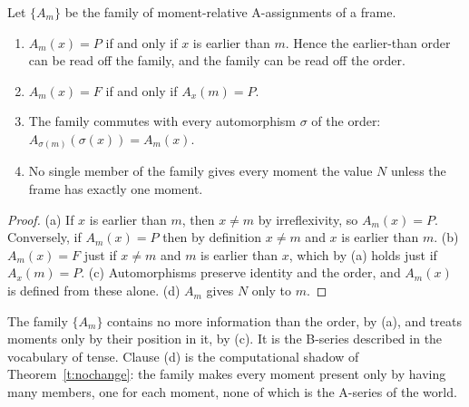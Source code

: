 \documentclass{situationist-preprint}
\begin{document}
\begin{proposition}\label{p:stage}
Let $\{A_m\}$ be the family of moment-relative A-assignments of a frame.
\begin{enumerate}[label=(\alph*)]
\item $A_m(x) = P$ if and only if $x$ is earlier than $m$. Hence the earlier-than order can be read off the family, and the family can be read off the order.
\item $A_m(x) = F$ if and only if $A_x(m) = P$.
\item The family commutes with every automorphism $\sigma$ of the order: $A_{\sigma(m)}(\sigma(x)) = A_m(x)$.
\item No single member of the family gives every moment the value $N$ unless the frame has exactly one moment.
\end{enumerate}
\end{proposition}

\begin{proof}
(a) If $x$ is earlier than $m$, then $x \ne m$ by irreflexivity, so $A_m(x) = P$. Conversely, if $A_m(x) = P$ then by definition $x \ne m$ and $x$ is earlier than $m$. (b) $A_m(x) = F$ just if $x \ne m$ and $m$ is earlier than $x$, which by (a) holds just if $A_x(m) = P$. (c) Automorphisms preserve identity and the order, and $A_m(x)$ is defined from these alone. (d) $A_m$ gives $N$ only to $m$.
\end{proof}

The family $\{A_m\}$ contains no more information than the order, by (a), and treats moments only by their position in it, by (c). It is the B-series described in the vocabulary of tense. Clause (d) is the computational shadow of Theorem~\ref{t:nochange}: the family makes every moment present only by having many members, one for each moment, none of which is the A-series of the world.
\end{document}
